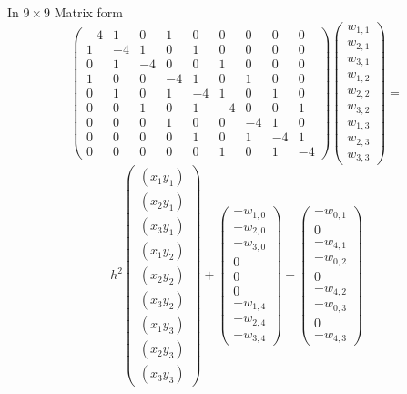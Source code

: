 In $9\times 9$ Matrix form
\[\left(\begin{array}{ccccccccc}
-4& 1 & 0 &1 &0 &0 &0 &0 &0\\
1&-4& 1 & 0 &1 &0 &0 &0 &0 \\
0 &1&-4&  0&0 &1 &0 &0 &0 \\
1 &0 &0 &-4& 1 & 0 &1 &0 &0\\
0 & 1 &0 &1&-4& 1 &0 &1 &0  \\
0 &0 &1 &0 &1&-4&0&  0 &1  \\
0&0&0&1 &0 &0 &-4& 1 & 0\\
0&0&0&0 & 1 &0 &1&-4& 1   \\
0&0&0&0 &0 &1 &0 &1&-4
\end{array}\right)
\left(\begin{array}{c}
w_{1,1}\\
w_{2,1}\\
w_{3,1}\\
w_{1,2}\\
w_{2,2}\\
w_{3,2}\\
w_{1,3}\\
w_{2,3}\\
w_{3,3}
\end{array}\right)=\]
\[
h^2\left(\begin{array}{c}
(x_1y_1)\\
(x_2y_1)\\
(x_3y_1)\\
(x_1y_2)\\
(x_2y_2)\\
(x_3y_2)\\
(x_1y_3)\\
(x_2y_3)\\
(x_3y_3)
\end{array}\right)+
\left(\begin{array}{c}
-w_{1,0}\\
-w_{2,0}\\
-w_{3,0}\\
0\\
0\\
0\\
-w_{1,4}\\
-w_{2,4}\\
-w_{3,4}
\end{array}\right)
+\left(\begin{array}{c}
-w_{0,1}\\
0\\
-w_{4,1}\\
-w_{0,2}\\
0\\
-w_{4,2}\\
-w_{0,3}\\
0\\
-w_{4,3}
\end{array}\right)
\]	

